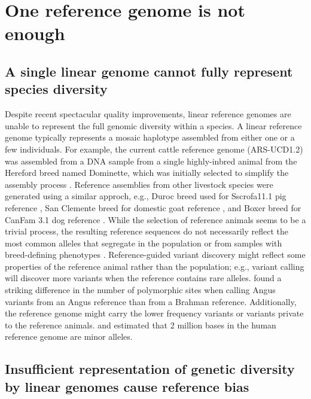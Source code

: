 \documentclass[../main.tex]{subfiles}
\begin{document}
\section{One reference genome is not enough}

\subsection*{A single linear genome cannot fully represent species diversity}

Despite recent spectacular quality improvements, linear reference genomes are unable to represent the full genomic diversity within a species. A linear reference genome typically represents a mosaic haplotype assembled from either one or a few individuals. For example, the current cattle reference genome (ARS-UCD1.2) was assembled from a DNA sample from a single highly-inbred animal from the Hereford breed named Dominette, which was initially selected to simplify the assembly process \citep{rosen2020novo}. Reference assemblies from  other livestock species were generated using a similar approch, e.g., Duroc breed used for Sscrofa11.1 pig reference \citep{warr2020improved}, San Clemente breed for domestic goat reference \citep{bickhart2017single}, and Boxer breed for  CanFam 3.1 dog reference \citep{lindblad2005genome}. While the selection of reference animals seems to be a trivial process, the resulting reference sequences do not necessarily reflect the most common alleles that segregate in the population or from samples with breed-defining phenotypes \citep{ballouz2019time}. Reference-guided variant discovery might reflect some properties of the reference animal rather than the population; e.g., variant calling will discover more variants when the reference  contains rare alleles. \citet{Low2020} found a striking difference in the number of polymorphic sites when calling Angus variants from an Angus reference than from a Brahman reference. Additionally, the reference genome might carry the lower frequency variants or variants private to the reference animals. \citet{shukla2019hg19kindel} and \citet{ballouz2019time} estimated that 2 million bases in the human reference genome are minor alleles. 

\subsection*{Insufficient representation of genetic diversity by linear genomes cause reference bias}
\end{document}
